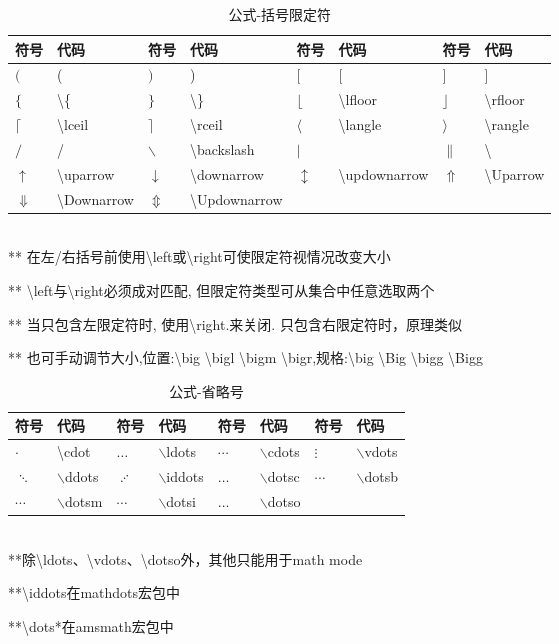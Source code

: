 \documentclass[UTF8,fontset=ubuntu]{ctexart}
\begin{document}
\begin{table}[H]
\begin{tabular}{l l l l l l l l}
	\hline
	符号 & 代码 & 符号 & 代码 & 符号 & 代码 & 符号 & 代码\\
	\hline
	$($ & ( & $)$ & ) & $[$ & [ & $]$ & ]\\
	$\{$ & \textbackslash \{ & $\}$ & \textbackslash \} & $\lfloor$ & \textbackslash lfloor & $\rfloor$ & \textbackslash rfloor\\
	$\lceil$ & \textbackslash lceil & $\rceil$ & \textbackslash rceil & $\langle$ & \textbackslash langle & $\rangle$ & \textbackslash rangle\\
	$/$ & / & $\backslash$ & \textbackslash backslash & $|$ & \textbar & $\|$ & \textbackslash\textbar\\
	$\uparrow$ & \textbackslash uparrow & $\downarrow$ & \textbackslash downarrow & $\updownarrow$ & \textbackslash updownarrow & $\Uparrow$ & \textbackslash Uparrow\\
	$\Downarrow$ & \textbackslash Downarrow & $\Updownarrow$ & \textbackslash Updownarrow\\
	\hline
\end{tabular}\\[2mm]
** 在左/右括号前使用\textbackslash left或\textbackslash right可使限定符视情况改变大小\par
** \textbackslash left与\textbackslash right必须成对匹配, 但限定符类型可从集合中任意选取两个\par
** 当只包含左限定符时, 使用\textbackslash right.来关闭. 只包含右限定符时，原理类似\par
** 也可手动调节大小,位置:\textbackslash big \textbackslash bigl \textbackslash bigm \textbackslash bigr,规格:\textbackslash big \textbackslash Big \textbackslash bigg \textbackslash Bigg
\caption{公式-括号限定符}
\end{table}

\begin{table}[H]
\begin{tabular}{l l l l l l l l}
	\hline
	符号 & 代码 & 符号 & 代码 & 符号 & 代码 & 符号 & 代码\\
	\hline
	$\cdot$ & \textbackslash cdot & $\ldots$ & $\backslash$ldots & $\cdots$ & $\backslash$cdots & $\vdots$ & $\backslash$vdots\\
	$\ddots$ & $\backslash$ddots & $\iddots$ & $\backslash$iddots & $\dotsc$ & $\backslash$dotsc & $\dotsb$ & $\backslash$dotsb\\
	$\dotsm$ & $\backslash$dotsm & $\dotsi$ & $\backslash$dotsi & $\dotso$ & $\backslash$dotso\\
	\hline
\end{tabular}\\[2mm]
\RaggedRight
**除\textbackslash ldots、\textbackslash vdots、\textbackslash dotso外，其他只能用于math mode\par
**\textbackslash iddots在mathdots宏包中\par
**\textbackslash dots*在amsmath宏包中
\caption{公式-省略号}
\end{table}
\end{document}
